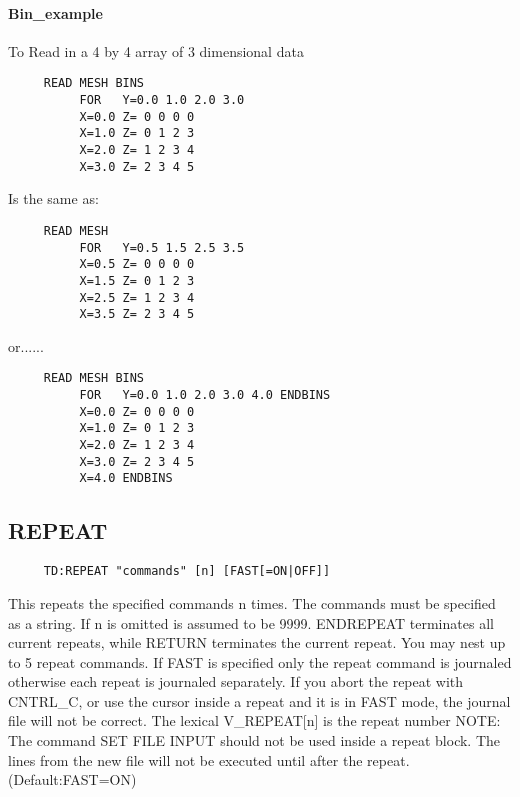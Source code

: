 \paragraph{Bin\_example}
To Read in a 4 by 4 array of 3 dimensional data 
\begin{verbatim}
     READ MESH BINS 
          FOR   Y=0.0 1.0 2.0 3.0 
          X=0.0 Z= 0 0 0 0 
          X=1.0 Z= 0 1 2 3 
          X=2.0 Z= 1 2 3 4 
          X=3.0 Z= 2 3 4 5 
\end{verbatim}

Is the same as:  
\begin{verbatim}
     READ MESH 
          FOR   Y=0.5 1.5 2.5 3.5 
          X=0.5 Z= 0 0 0 0 
          X=1.5 Z= 0 1 2 3 
          X=2.5 Z= 1 2 3 4 
          X=3.5 Z= 2 3 4 5 
\end{verbatim}
or......  
\begin{verbatim}
     READ MESH BINS 
          FOR   Y=0.0 1.0 2.0 3.0 4.0 ENDBINS 
          X=0.0 Z= 0 0 0 0 
          X=1.0 Z= 0 1 2 3 
          X=2.0 Z= 1 2 3 4 
          X=3.0 Z= 2 3 4 5 
          X=4.0 ENDBINS 
\end{verbatim}
\subsection{REPEAT}
\begin{verbatim}
     TD:REPEAT "commands" [n] [FAST[=ON|OFF]] 
\end{verbatim}
This  repeats  the  specified  commands  n  times.   The commands must be
specified as a string.  If n is omitted is assumed to be 9999.  ENDREPEAT
terminates  all  current  repeats,  while  RETURN  terminates the current
repeat.  You may nest up to 5 repeat commands.  If FAST is specified only
the  repeat  command  is  journaled  otherwise  each  repeat is journaled
separately.  If you abort the repeat with  CNTRL\_C,  or  use  the  cursor
inside  a  repeat  and  it  is in FAST mode, the journal file will not be
correct.  The lexical V\_REPEAT[n] is the repeat number 
NOTE:   The  command  SET  FILE  INPUT should not be used inside a repeat
block.  The lines from the new file will not be executed until after  the
repeat.  
(Default:FAST=ON) 
